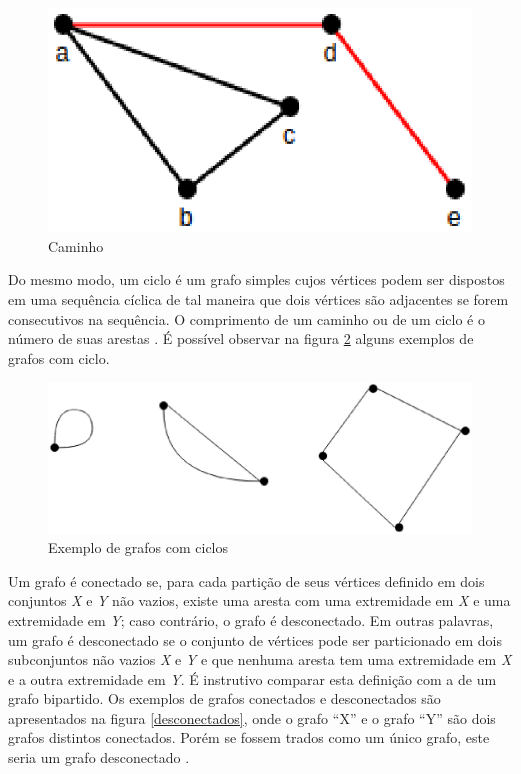 \begin{apendicesenv}
\begin{figure}[!h]
	\centering
	\includegraphics[scale=0.5]{figuras/capitulo2/caminho.eps}
	\caption[Caminho]{Caminho \cite{Costa:2011}}
	\label{caminho}
\end{figure}

Do mesmo modo, um ciclo é um grafo simples cujos vértices podem ser dispostos em uma sequência cíclica de tal maneira que dois vértices são adjacentes se forem consecutivos na sequência. O comprimento de um caminho ou de um ciclo é o número de suas arestas \cite{Costa:2011}. É possível observar na figura \ref{ciclos} alguns exemplos de grafos com ciclo.

\begin{figure}[!h]
	\centering
	\includegraphics[scale=0.3]{figuras/capitulo2/ciclos.eps}
	\caption[Exemplo de grafos com ciclos]{Exemplo de grafos com ciclos \cite{Costa:2011}}
	\label{ciclos}
\end{figure}

Um grafo é conectado se, para cada partição de seus vértices definido em dois conjuntos \textit{X} e \textit{Y} não vazios, existe uma aresta com uma extremidade em \textit{X} e uma extremidade em \textit{Y}; caso contrário, o grafo é desconectado. Em outras palavras, um grafo é desconectado se o conjunto de vértices pode ser particionado em dois subconjuntos não vazios \textit{X} e \textit{Y} e que nenhuma aresta tem uma extremidade em \textit{X} e a outra extremidade em \textit{Y}. É instrutivo comparar esta definição com a de um grafo bipartido. Os exemplos de grafos conectados e desconectados são apresentados na figura \ref{desconectados}, onde o grafo ``X'' e o grafo ``Y'' são dois grafos distintos conectados. Porém se fossem trados como um único grafo, este seria um grafo desconectado \cite{Bondy:2007}.


\end{apendicesenv}
